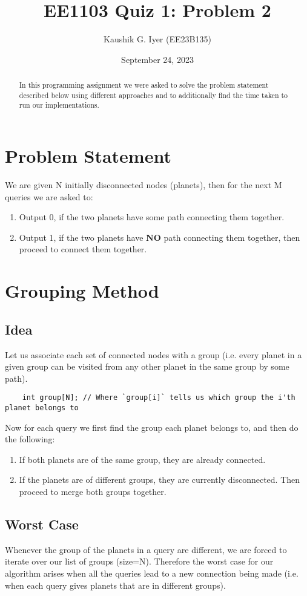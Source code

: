 \documentclass[a4paper]{article}
\title{EE1103 Quiz 1: Problem 2}
\author{Kaushik G. Iyer (EE23B135)}
\date{September 24, 2023}
\begin{document}
\maketitle

\begin{abstract}
In this programming assignment we were asked to solve the problem statement described below using different approaches and to additionally find the time taken to run our implementations.
\end{abstract}

\section*{Problem Statement}
We are given N initially disconnected nodes (planets), then for the next M queries we are asked to:
\begin{enumerate}
    \item Output 0, if the two planets have some path connecting them together.
    \item Output 1, if the two planets have $\boldsymbol{NO}$ path connecting them together, then proceed to connect them together.
\end{enumerate}

\section{Grouping Method}
\subsection{Idea}
Let us associate each set of connected nodes with a group (i.e. every planet in a given group can be visited from any other planet in the same group by some path).
\begin{verbatim}
    int group[N]; // Where `group[i]` tells us which group the i'th planet belongs to
\end{verbatim}
Now for each query we first find the group each planet belongs to, and then do the following:
\begin{enumerate}
    \item If both planets are of the same group, they are already connected.
    \item If the planets are of different groups, they are currently disconnected. Then proceed to merge both groups together.
\end{enumerate}

\subsection{Worst Case}
Whenever the group of the planets in a query are different, we are forced to iterate over our list of groups (size=N). Therefore the worst case for our algorithm arises when all the queries lead to a new connection being made (i.e. when each query gives planets that are in different groups).
\end{document}
